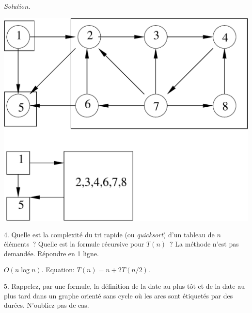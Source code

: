 \documentclass[11pt]{article}
\newcommand{\comment}[1]{}
\begin{document}
 
\ifcorrige
{\it Solution.}
\begin{center}
\includegraphics[width=0.6\linewidth]{scc_bis.eps}
\end{center}
\else
\fi

 
4.  Quelle est la complexité du tri rapide (ou {\it quicksort}) d'un tableau de $n$ éléments~? Quelle est la formule récursive pour $T(n)$~? La méthode n'est pas demandée.
Répondre en 1 ligne.

 
\ifcorrige
$O(n \log n)$. Equation: $T(n)=n+2T(n/2)$.
\else
\fi


\comment{
5. Peut-on utiliser l'algorithme de Dijkstra quand les arcs portent des coûts négatifs~? Même question pour l'algorithme de  Ford (ou Ford-Bellman, ou Bellman-Ford, ou Bellman–Ford–Moore\footnote{En fait, Alfonso Shimbel l'a proposé avant, en 1955 [Wikipedia].})~? %
\ifcorrige
{\it Solution. Non pour Dijkstra. Oui pour Ford.}
\else
\fi
}


\comment{
6. Un graphe orienté a des arcs étiquetés avec des coûts négatifs. Existe-t-il forcément des circuits de coût global négatif~? Si oui, prouvez-le~; sinon, prouvez-le.
%
\ifcorrige
{\it Solution. Non, pas forcément. Un contre-exemple suffit pour le prouver. Le graphe qui ne contient que l'arc~: $a\rightarrow b$ de coût $-1$ n'a pas de cycle donc pas de cycle de coût global négatif. Autre contre-exemple~: le graphe avec deux arcs~: $a\rightarrow b$ de coût $-1$ et $b\rightarrow a$ de coût 2. 
}
\else
\fi
}
 
5. Rappelez, par une formule, la définition de la date au plus tôt et de la date au plus tard dans un graphe orienté sans cycle où les arcs sont étiquetés par des durées. N'oubliez pas de cas.  %
\end{document}
